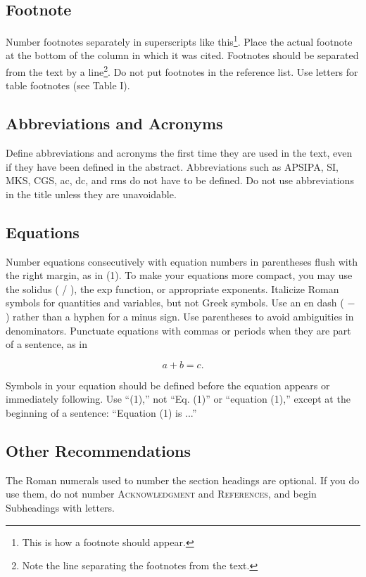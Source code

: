 \documentclass[conference,a4paper]{APSIPA2026}
\begin{document}
\subsection{Footnote}
Number footnotes separately in superscripts like this\footnote{This is how a footnote should appear.}.
Place the actual footnote at the bottom of the column in which it was cited.
Footnotes should be separated from the text by a line\footnote{Note the line separating the footnotes from the text.}.
Do not put footnotes in the reference list.
Use letters for table footnotes (see Table I).

\subsection{Abbreviations and Acronyms}
Define abbreviations and acronyms the first time they are used in the text, even if they have been defined in the abstract.
Abbreviations such as APSIPA, SI, MKS, CGS, ac, dc, and rms do not have to be defined.
Do not use abbreviations in the title unless they are unavoidable.

\subsection{Equations}
Number equations consecutively with equation numbers in parentheses flush with the right margin, as in (1).
To make your equations more compact, you may use the solidus ( / ), the exp function, or appropriate exponents.
Italicize Roman symbols for quantities and variables, but not Greek symbols.
Use an en dash ( $-$ ) rather than a hyphen for a minus sign.
Use parentheses to avoid ambiguities in denominators.
Punctuate equations with commas or periods when they are part of a sentence, as in

\begin{equation}
 a + b = c.
\end{equation}

Symbols in your equation should be defined before the equation appears or immediately following.
Use ``(1),'' not ``Eq. (1)'' or ``equation (1),'' except at the beginning of a sentence: ``Equation (1) is ...''

\subsection{Other Recommendations}
The Roman numerals used to number the section headings are optional.
If you do use them, do not number {\scshape{Acknowledgment}} and {\scshape{References}}, and begin Subheadings with letters.
\end{document}
